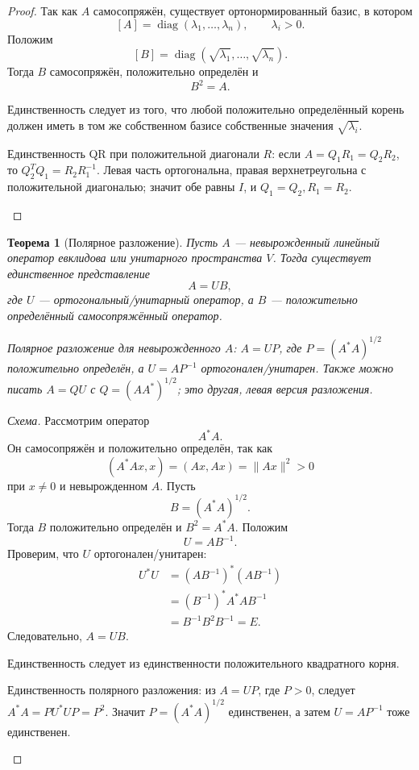 \documentclass[12pt,a4paper]{article}
\theoremstyle{definition}
\theoremstyle{plain}
\newtheorem{theorem}[definition]{Теорема}
\theoremstyle{remark}
\newenvironment{knowledgefix}{\begin{clarifybox}}{\end{clarifybox}}
\newcommand{\diag}{\operatorname{diag}}
\begin{document}
\begin{proof}
Так как $A$ самосопряжён, существует ортонормированный базис, в котором
\[
    [A]=\diag(\lambda_1,\ldots,\lambda_n),
    \qquad
    \lambda_i>0.
\]
Положим
\[
    [B]=\diag(\sqrt{\lambda_1},\ldots,\sqrt{\lambda_n}).
\]
Тогда $B$ самосопряжён, положительно определён и
\[
    B^2=A.
\]

Единственность следует из того, что любой положительно определённый корень должен иметь в том же собственном базисе собственные значения $\sqrt{\lambda_i}$.
\begin{knowledgefix}
Единственность QR при положительной диагонали \(R\): если \(A=Q_1R_1=Q_2R_2\), то \(Q_2^TQ_1=R_2R_1^{-1}\). Левая часть ортогональна, правая верхнетреугольна с положительной диагональю; значит обе равны \(I\), и \(Q_1=Q_2, R_1=R_2\).
\end{knowledgefix}
\end{proof}

\begin{theorem}[Полярное разложение]
Пусть $A$ --- невырожденный линейный оператор евклидова или унитарного пространства $V$.
Тогда существует единственное представление
\[
    A=UB,
\]
где $U$ --- ортогональный/унитарный оператор, а $B$ --- положительно определённый самосопряжённый оператор.
\begin{knowledgefix}
Полярное разложение для невырожденного \(A\): \(A=UP\), где \(P=(A^*A)^{1/2}\) положительно определён, а \(U=AP^{-1}\) ортогонален/унитарен. Также можно писать \(A=Q U\) с \(Q=(AA^*)^{1/2}\); это другая, левая версия разложения.
\end{knowledgefix}
\end{theorem}

\begin{proof}[Схема]
Рассмотрим оператор
\[
    A^*A.
\]
Он самосопряжён и положительно определён, так как
\[
    (A^*Ax,x)=(Ax,Ax)=\|Ax\|^2>0
\]
при $x\ne0$ и невырожденном $A$.
Пусть
\[
    B=(A^*A)^{1/2}.
\]
Тогда $B$ положительно определён и $B^2=A^*A$.
Положим
\[
    U=AB^{-1}.
\]
Проверим, что $U$ ортогонален/унитарен:
\[
\begin{aligned}
    U^*U
    &=(AB^{-1})^*(AB^{-1})\\
    &=(B^{-1})^*A^*AB^{-1}\\
    &=B^{-1}B^2B^{-1}=E.
\end{aligned}
\]
Следовательно, $A=UB$.

Единственность следует из единственности положительного квадратного корня.
\begin{knowledgefix}
Единственность полярного разложения: из \(A=UP\), где \(P>0\), следует \(A^*A=P U^* U P=P^2\). Значит \(P=(A^*A)^{1/2}\) единственен, а затем \(U=AP^{-1}\) тоже единственен.
\end{knowledgefix}
\end{proof}
\end{document}
